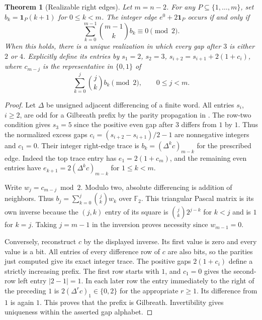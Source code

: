\documentclass[11pt,a4paper]{article}
\newtheorem{theorem}{Theorem}[section]
\begin{document}
\begin{theorem}[Realizable right edges]
\label{thm:reachable}
Let $m=n-2$. For any $P\subseteq\{1,\ldots,m\}$, set $b_k=\mathbf1_P(k+1)$ for $0\le k<m$. The integer edge $e^0+2\mathbf1_P$ occurs if and only if
\[
 \sum_{k=0}^{m-1}\binom{m-1}{k}b_k\equiv0\pmod2.
\]
When this holds, there is a unique realization in which every gap after $3$ is either $2$ or $4$. Explicitly define its entries by $s_1=2$, $s_2=3$, $s_{i+2}=s_{i+1}+2(1+c_i)$, where $c_{m-j}$ is the representative in $\{0,1\}$ of
\[
 \sum_{k=0}^j\binom{j}{k}b_k\pmod2,\qquad 0\le j<m.
\]
\end{theorem}
\begin{proof}
Let $\Delta$ be unsigned adjacent differencing of a finite word. All entries $s_i$, $i\ge2$, are odd for a Gilbreath prefix by the parity propagation in \cite{muney}. The row-two condition gives $s_3=5$ since the positive even gap after $3$ differs from $1$ by $1$. Thus the normalized excess gaps $c_i=(s_{i+2}-s_{i+1})/2-1$ are nonnegative integers and $c_1=0$. Their integer right-edge trace is $b_k=(\Delta^k c)_{m-k}$ for the prescribed edge. Indeed the top trace entry has $e_1=2(1+c_m)$, and the remaining even entries have $e_{k+1}=2(\Delta^k c)_{m-k}$ for $1\le k<m$.

Write $w_j=c_{m-j}\bmod2$. Modulo two, absolute differencing is addition of neighbors. Thus $b_j=\sum_{k=0}^j\binom{j}{k}w_k$ over $\mathbb F_2$. This triangular Pascal matrix is its own inverse because the $(j,k)$ entry of its square is $\binom jk 2^{j-k}$ for $k<j$ and is $1$ for $k=j$. Taking $j=m-1$ in the inversion proves necessity since $w_{m-1}=0$.

Conversely, reconstruct $c$ by the displayed inverse. Its first value is zero and every value is a bit. All entries of every difference row of $c$ are also bits, so the parities just computed give its exact integer trace. The positive gaps $2(1+c_i)$ define a strictly increasing prefix. The first row starts with $1$, and $c_1=0$ gives the second-row left entry $|2-1|=1$. In each later row the entry immediately to the right of the preceding $1$ is $2(\Delta^r c)_1\in\{0,2\}$ for the appropriate $r\ge1$. Its difference from $1$ is again $1$. This proves that the prefix is Gilbreath. Invertibility gives uniqueness within the asserted gap alphabet.
\end{proof}
\end{document}
